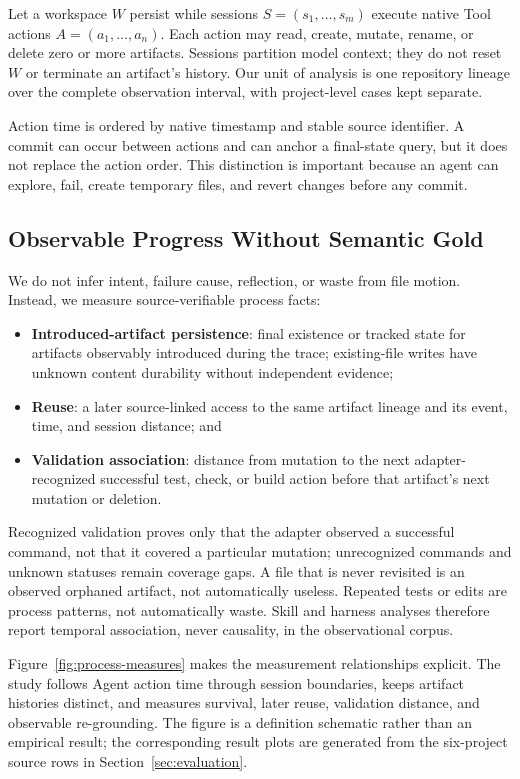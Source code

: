 \documentclass[letterpaper]{article}
\begin{document}
Let a workspace $W$ persist while sessions $S=(s_1,\ldots,s_m)$ execute native
Tool actions $A=(a_1,\ldots,a_n)$.  Each action may read, create, mutate,
rename, or delete zero or more artifacts.  Sessions partition model context;
they do not reset $W$ or terminate an artifact's history.  Our unit of analysis
is one repository lineage over the complete observation interval, with
project-level cases kept separate.

Action time is ordered by native timestamp and stable source identifier.  A
commit can occur between actions and can anchor a final-state query, but it
does not replace the action order.  This distinction is important because an
agent can explore, fail, create temporary files, and revert changes before any
commit.

\subsection{Observable Progress Without Semantic Gold}

We do not infer intent, failure cause, reflection, or waste from file motion.
Instead, we measure source-verifiable process facts:

\begin{itemize}[leftmargin=*,itemsep=2pt]
  \item \textbf{Introduced-artifact persistence}: final existence or tracked
  state for artifacts observably introduced during the trace; existing-file
  writes have unknown content durability without independent evidence;
  \item \textbf{Reuse}: a later source-linked access to the same artifact
  lineage and its event, time, and session distance; and
  \item \textbf{Validation association}: distance from mutation to the next
  adapter-recognized successful test, check, or build action before that
  artifact's next mutation or deletion.
\end{itemize}

Recognized validation proves only that the adapter observed a successful
command, not that it covered a particular mutation; unrecognized commands and
unknown statuses remain coverage gaps.  A file that is never revisited is an observed orphaned
artifact, not automatically useless.  Repeated tests or edits are process
patterns, not automatically waste.  Skill and harness analyses therefore
report temporal association, never causality, in the observational corpus.

Figure~\ref{fig:process-measures} makes the measurement relationships explicit.
The study follows Agent action time through session boundaries, keeps artifact
histories distinct, and measures survival, later reuse, validation distance,
and observable re-grounding.  The figure is a definition schematic rather than
an empirical result; the corresponding result plots are generated from the
six-project source rows in Section~\ref{sec:evaluation}.
\end{document}

